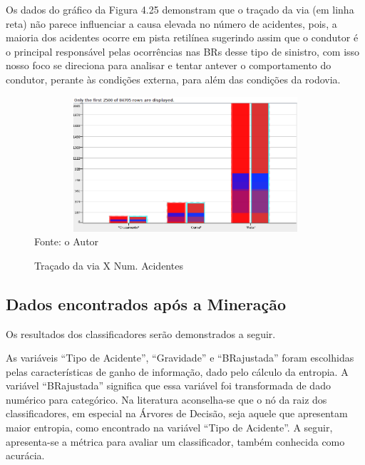Os dados do gráfico da Figura 4.25 demonstram que o traçado da via (em linha reta) não parece influenciar a causa  elevada no número de acidentes, pois, a maioria dos acidentes ocorre em pista retilínea sugerindo assim que o condutor é o principal responsável pelas ocorrências nas BRs desse tipo de sinistro, com isso nosso foco se direciona para analisar e tentar antever o comportamento do condutor, perante às condições externa, para além das condições da rodovia.

\begin{figure}[ht]
\begin{center}
\caption{Traçado da via X Num. Acidentes}
\includegraphics[width=150mm, height=50mm]{Figuras/Preprocess/TracadoViaNumAcident.png}\\
\tiny Fonte: o Autor
\end{center}
\end{figure}




\pagebreak



\subsection{Dados encontrados após a Mineração}

Os resultados dos classificadores serão demonstrados a
seguir.

As variáveis “Tipo de Acidente”, “Gravidade” e
“BRajustada” foram escolhidas pelas características de ganho
de informação, dado pelo cálculo da entropia. A variável “BRajustada”
significa que essa variável foi transformada de dado numérico para categórico. Na literatura \cite{NorvigRussel2004} aconselha-se que o nó da raiz dos classificadores, em especial na Árvores de Decisão, seja aquele que apresentam maior
entropia, como encontrado na variável “Tipo de Acidente”.  
A seguir, apresenta-se a métrica para avaliar um classificador, também conhecida como acurácia.

